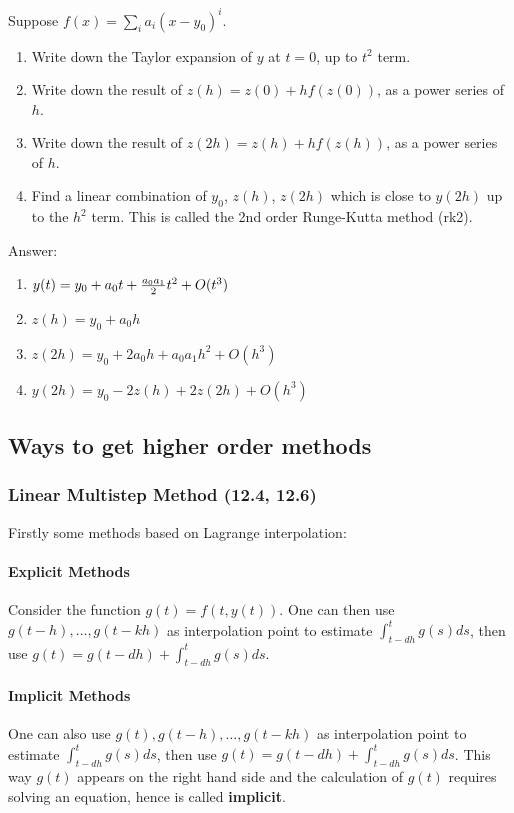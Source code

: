 \documentclass[20pt]{article} %
\theoremstyle{break}
\begin{document}
Suppose $f(x)=\sum_ia_i(x-y_0)^i$.

\begin{enumerate}
\item Write down the Taylor expansion of $y$ at $t=0$, up to $t^2$ term.
\item Write down the result of $z(h)=z(0)+hf(z(0))$, as a power series of $h$.
\item Write down the result of $z(2h)=z(h)+hf(z(h))$, as a power series of $h$.
\item Find a linear combination of $y_0$, $z(h)$, $z(2h)$ which is close to $y(2h)$ up to the $h^2$ term. This is called the 2nd order Runge-Kutta method (rk2).
\end{enumerate}

Answer:

\begin{enumerate}
\item $y(t)=y_0+a_0t+{a_0a_1\over 2}t^2+O(t^3)$
\item $z(h)=y_0+a_0h$
\item $z(2h)=y_0+2a_0h+a_0a_1h^2+O(h^3)$
\item $y(2h)=y_0-2z(h)+2z(2h)+O(h^3)$
\end{enumerate}


\newpage

\subsection{Ways to get higher order methods}

\subsubsection{Linear Multistep Method (12.4, 12.6)}

Firstly some methods based on Lagrange interpolation:

\paragraph{Explicit Methods} Consider the function $g(t)=f(t, y(t))$. One can then use $g(t-h), \dots, g(t-kh)$ as interpolation point to estimate $\int_{t-dh}^{t}g(s)ds$, then use $g(t)=g(t-dh)+\int_{t-dh}^{t}g(s)ds$.

\paragraph{Implicit Methods} One can also use $g(t), g(t-h), \dots, g(t-kh)$ as interpolation point to estimate $\int_{t-dh}^{t}g(s)ds$, then use $g(t)=g(t-dh)+\int_{t-dh}^{t}g(s)ds$. This way $g(t)$ appears on the right hand side and the calculation of $g(t)$ requires solving an equation, hence is called {\bf implicit}.
\end{document}
